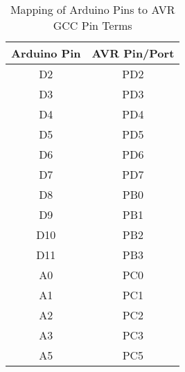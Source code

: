 \begin{table}[h]
    \centering
    \begin{tabular}{|c|c|}
        \hline
        \textbf{Arduino Pin} & \textbf{AVR Pin/Port} \\
        \hline
        D2  & PD2 \\
        D3  & PD3 \\
        D4  & PD4 \\
        D5  & PD5 \\
        D6  & PD6 \\
        D7  & PD7 \\
        D8  & PB0 \\
        D9  & PB1 \\
        D10 & PB2 \\
        D11 & PB3 \\
        A0  & PC0 \\
        A1  & PC1 \\
        A2  & PC2 \\
        A3  & PC3 \\
        A5  & PC5 \\
        \hline
    \end{tabular}
    \caption{Mapping of Arduino Pins to AVR GCC Pin Terms}
    \label{tab:avr_mapping}
\end{table}

